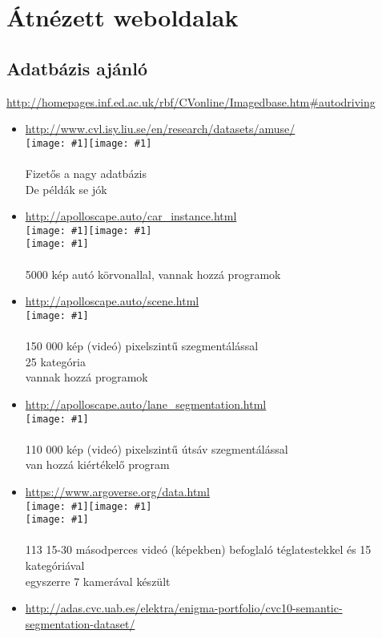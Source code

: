 \documentclass[12pt]{report}
\newcommand{\img}[1]{\texttt{[image: \#1]}}
\begin{document}
\chapter{Átnézett weboldalak}
\section{Adatbázis ajánló}
\url{http://homepages.inf.ed.ac.uk/rbf/CVonline/Imagedbase.htm#autodriving}
\begin{itemize}
	\item \url{http://www.cvl.isy.liu.se/en/research/datasets/amuse/}
	\\	\img{1}\img{2}
	\\
	\\Fizetős a nagy adatbázis
	\\De példák se jók
	\item \url{http://apolloscape.auto/car_instance.html}
	\\	\img{3}\img{4}
	\\\img{5}
	\\
	\\5000 kép autó körvonallal, vannak hozzá programok
	\item \url{http://apolloscape.auto/scene.html}
	\\\img{6}
	\\
	\\150 000 kép (videó) pixelszintű szegmentálással
	\\25 kategória
	\\vannak hozzá programok
	\item \url{http://apolloscape.auto/lane_segmentation.html}
	\\\img{7}
	\\
	\\110 000 kép (videó) pixelszintű útsáv szegmentálással
	\\van hozzá kiértékelő program
	\item \url{https://www.argoverse.org/data.html}
	\\\img{8}\img{9}
	\\\img{10}
	\\
	\\113 15-30 másodperces videó (képekben) befoglaló téglatestekkel és 15 kategóriával
	\\egyszerre 7 kamerával készült
	\item \url{http://adas.cvc.uab.es/elektra/enigma-portfolio/cvc10-semantic-segmentation-dataset/}

\end{itemize}
\end{document}

